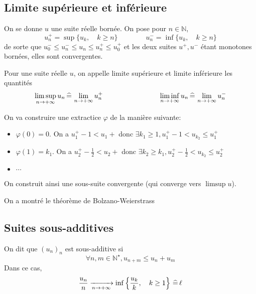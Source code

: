 \subsection{Limite supérieure et inférieure}

On se donne $u$ une suite réelle bornée. On pose pour $n\in\mathbb N$, \[
    u_n^+=\sup\{u_k, \quad k\geq n\}\qquad \qquad u_n^-=\inf \{u_k,\quad k\geq n\}
\]
de sorte que $u_0^-\leq u_n^-\leq u_n\leq u_n^+\leq u_0^+$ et les deux suites $u^+, u^-$ étant monotones bornées, elles sont convergentes.

\begin{dfn}
    Pour une suite réelle $u$, on appelle limite supérieure et limite inférieure les quantités \[
        \limsup_{n\to+\infty}u_n\,\widehat=\,\lim_{n\to+\infty}u_n^+\qquad\qquad\qquad\qquad \liminf_{n\to+\infty}u_n\,\widehat=\,\lim_{n\to+\infty}u_n^-
    \]
\end{dfn}

On va construire une extractice $\varphi$ de la manière suivante: \begin{itemize}
    \item $\varphi(0)=0$. On a $u_1^+-1<u_1+$ donc $\exists k_1\geq 1, u_1^+-1<u_{k_2}\leq u_1^+$
    \item $\varphi(1)=k_1$. On a $u_2^+-\frac12<u_2+$ donc $\exists k_2\geq k_1, u_2^+-\frac12<u_{k_2}\leq u_2^+$
    \item $\cdots$
\end{itemize}
On construit ainsi une sous-suite convergente (qui converge vers $\limsup u$).

\begin{rem}
    On a montré le théorème de Bolzano-Weierstrass
\end{rem}

\needspace{5cm}
\subsection{Suites sous-additives}

\begin{res}
    On dit que $(u_n)_n$ est sous-additive si \[
        \forall n, m\in\mathbb N^\star, u_{n+m}\leq u_n+u_m
    \]
    Dans ce cas, \[
        \frac{u_n}n\xrightarrow[n\to+\infty]{}\inf\left\{\frac{u_k}k, \quad k\geq 1\right\}\,\widehat=\,\ell
    \]
\end{res}

